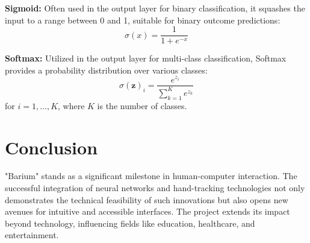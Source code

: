 \documentclass{article}
\begin{document}
\textbf{Sigmoid:} Often used in the output layer for binary classification, it squashes the input to a range between 0 and 1, suitable for binary outcome predictions:
\begin{equation}
\sigma(x) = \frac{1}{1 + e^{-x}}
\end{equation}

\textbf{Softmax:} Utilized in the output layer for multi-class classification, Softmax provides a probability distribution over various classes:
\begin{equation}
\sigma(\mathbf{z})_i = \frac{e^{z_i}}{\sum_{k=1}^{K} e^{z_k}}
\end{equation}
for \( i = 1, \ldots, K \), where \( K \) is the number of classes.



\section{Conclusion}
"Barium" stands as a significant milestone in human-computer interaction. The successful integration of neural networks and hand-tracking technologies not only demonstrates the technical feasibility of such innovations but also opens new avenues for intuitive and accessible interfaces. The project extends its impact beyond technology, influencing fields like education, healthcare, and entertainment.



\end{document}
